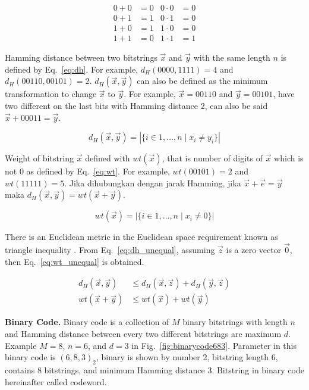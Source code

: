 \documentclass{TTP_DSL2006}
\renewcommand{\vec}{\overrightarrow}
\begin{document}
\begin{align*}
0 + 0 &= 0 & 0 \cdot 0 &= 0 \\
0 + 1 &= 1 & 0 \cdot 1 &= 0 \\
1 + 0 &= 1 & 1 \cdot 0 &= 0 \\
1 + 1 &= 0 & 1 \cdot 1 &= 1
\end{align*}

Hamming distance between two bitstrings $\vec{x}$ and $\vec{y}$ with the same length $n$ is defined by Eq.~\ref{eq:dh}. For example, $d_H(0000,1111)= 4$ and $d_H(00110,00101)= 2$. $d_H(\vec{x},\vec{y})$ can also be defined as the minimum transformation to change $\vec{x}$ to $\vec{y}$. For example, $\vec{x}=00110$ and $\vec{y}=00101$, have two different on the last bits with Hamming distance 2, can also be said $\vec{x}+00011 = \vec{y}$.

\begin{equation} \label{eq:dh}
d_H(\vec{x},\vec{y}) = |\{i \in {1,\ldots,n} \mid x_i \neq y_i\}|
\end{equation}

Weight of bitstring $\vec{x}$ defined with $wt(\vec{x})$, that is number of digits of $\vec{x}$ which is not $0$ as defined by Eq.~\ref{eq:wt}. For example, $wt(00101) = 2$ and $wt(11111) = 5$. Jika dihubungkan dengan jarak Hamming, jika $\vec{x}+\vec{e} = \vec{y}$ maka $d_H(\vec{x},\vec{y}) = wt(\vec{x}+\vec{y})$.

\begin{equation} \label{eq:wt}
wt(\vec{x}) = |\{i \in {1,\ldots,n} \mid x_i \neq 0\}|
\end{equation}

There is an Euclidean metric in the Euclidean space requirement known as triangle inequality \cite{VanLint2016}. From Eq.~\ref{eq:dh_unequal}, assuming $\vec{z}$ is a zero vector $\vec{0}$, then Eq.~\ref{eq:wt_unequal} is obtained.

\begin{align}
d_H(\vec{x},\vec{y}) &\le d_H(\vec{x},\vec{z}) + d_H(\vec{y},\vec{z}) \label{eq:dh_unequal} \\
wt(\vec{x}+\vec{y}) &\le wt(\vec{x}) + wt(\vec{y}) \label{eq:wt_unequal}
\end{align}


\noindent \textbf{Binary Code.}
Binary code is a collection of $M$ binary bitstrings with length $n$ and Hamming distance between every two different bitstrings are maximum $d$. Example $M=8$, $n=6$, and $d=3$ in Fig.~\ref{fig:binarycode683}. Parameter in this binary code is $(6,8,3)_2$, binary is shown by number 2, bitstring length 6, contains 8 bitstrings, and minimum Hamming distance 3. Bitstring in binary code hereinafter called codeword.
\end{document}
